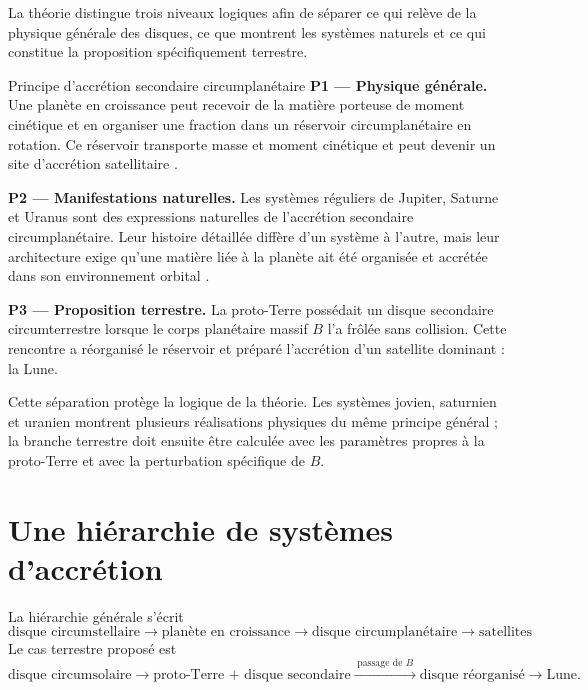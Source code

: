\documentclass[11pt,a4paper,openany]{report}
\begin{document}
La théorie distingue trois niveaux logiques afin de séparer ce qui relève de la physique générale
des disques, ce que montrent les systèmes naturels et ce qui constitue la proposition
spécifiquement terrestre.

\begin{principe}{Principe d'accrétion secondaire circumplanétaire}
\textbf{P1 --- Physique générale.} Une planète en croissance peut recevoir de la matière porteuse
de moment cinétique et en organiser une fraction dans un réservoir circumplanétaire en rotation.
Ce réservoir transporte masse et moment cinétique et peut devenir un site d'accrétion
satellitaire \cite{Pringle1981,CanupWard2002,CanupWard2006}.

\smallskip
\textbf{P2 --- Manifestations naturelles.} Les systèmes réguliers de Jupiter, Saturne et Uranus
sont des expressions naturelles de l'accrétion secondaire circumplanétaire. Leur histoire
détaillée diffère d'un système à l'autre, mais leur architecture exige qu'une matière liée à la
planète ait été organisée et accrétée dans son environnement orbital
\cite{Nimmo2026,Blanc2025,Helled2020}.

\smallskip
\textbf{P3 --- Proposition terrestre.} La proto-Terre possédait un disque secondaire
circumterrestre lorsque le corps planétaire massif $B$ l'a frôlée sans collision. Cette rencontre
a réorganisé le réservoir et préparé l'accrétion d'un satellite dominant : la Lune.
\end{principe}

Cette séparation protège la logique de la théorie. Les systèmes jovien, saturnien et uranien
montrent plusieurs réalisations physiques du même principe général ; la branche terrestre doit
ensuite être calculée avec les paramètres propres à la proto-Terre et avec la perturbation
spécifique de $B$.

\section{Une hiérarchie de systèmes d'accrétion}

La hiérarchie générale s'écrit
\begin{equation}
\text{disque circumstellaire}\to\text{planète en croissance}\to
\text{disque circumplanétaire}\to\text{satellites}
\label{eq:hierarchie-gen}
\end{equation}
Le cas terrestre proposé est
\begin{equation}
\text{disque circumsolaire}\rightarrow\text{proto-Terre + disque secondaire}
\xrightarrow{\;\text{passage de }B\;}\text{disque réorganisé}\rightarrow\text{Lune}.
\label{eq:hierarchie-terre}
\end{equation}
\end{document}
